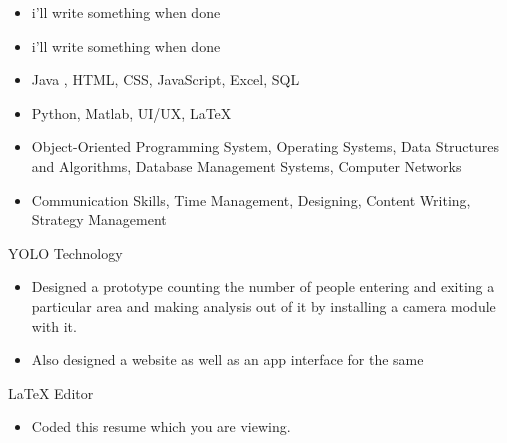 
\begin{itemize}
\item i'll write something when done
 
\end{itemize}
\smallskip
\smallskip



\begin{itemize}
\item i'll write something when done
 
\end{itemize}
\smallskip
     
     
     	

\begin{itemize}
    \item{Java , HTML, CSS, JavaScript, Excel, SQL}
\end{itemize}


\smallskip
{}
\begin{itemize}
    \item Python, Matlab, UI/UX, LaTeX
\end{itemize}

\smallskip
{}
\begin{itemize}
    \item Object-Oriented Programming System, Operating Systems, Data Structures and Algorithms, Database Management Systems, Computer Networks
\end{itemize}  

\smallskip 
{}
\begin{itemize}
    \item Communication Skills, Time Management, Designing, Content Writing, Strategy Management
\end{itemize}
 


 {YOLO Technology }
\begin{itemize}
    
    \item Designed  a prototype  counting the number of people entering and exiting a particular area and making analysis out of it by installing a camera module with it.
    \item Also designed a website as well as an app interface for the same 
   
\end{itemize}
\smallskip
{} {LaTeX Editor }
\begin{itemize}
    
    \item Coded this resume which you are viewing.
    
\end{itemize}
\smallskip




